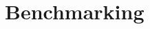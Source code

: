 \documentclass[12pt]{article}
\begin{document}
\maketitle
\newpage

\section{Benchmarking}


\newpage

\newpage

\end{document}
